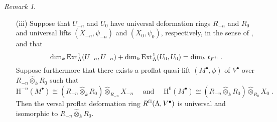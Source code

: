 \documentclass{amsart}
\theoremstyle{plain}
\theoremstyle{definition}
\theoremstyle{remark}
\newtheorem{rem}[thm]{Remark}
\begin{document}
\begin{rem}
\begin{enumerate}
\item[(iii)]
Suppose that $U_{-n}$ and $U_0$ have universal deformation rings $R_{-n}$ and $R_0$
and universal lifts $(X_{-n},\psi_{-n})$ and $(X_0,\psi_0)$, respectively,
in the sense of \cite{blehervelez}, and that
$$\mathrm{dim}_k\, \mathrm{Ext}^1_{\Lambda}(U_{-n},U_{-n}) +
\mathrm{dim}_k \,\mathrm{Ext}^1_{\Lambda}(U_{0},U_{0}) =
\mathrm{dim}_k \;t_{F^{\mathrm{f\/l}}}\;.$$
Suppose furthermore that there exists a proflat quasi-lift
$(M^\bullet,\phi)$ of $V^\bullet$ over $R_{-n}\hat{\otimes}_k R_0$
such that
$${\mathrm{H}}^{-n}(M^\bullet)\cong (R_{-n}\hat{\otimes}_k R_0)\hat{\otimes}_{R_{-n}}X_{-n}
\quad \mbox{ and } \quad
{\mathrm{H}}^0(M^\bullet)\cong (R_{-n}\hat{\otimes}_k R_0)\hat{\otimes}_{R_0} X_0\;.$$
Then the versal proflat deformation ring $R^{\mathrm{f\/l}}(\Lambda,V^\bullet)$ is universal and
isomorphic to $R_{-n}\hat{\otimes}_k R_0$.
\end{enumerate}
\end{rem}
\end{document}
